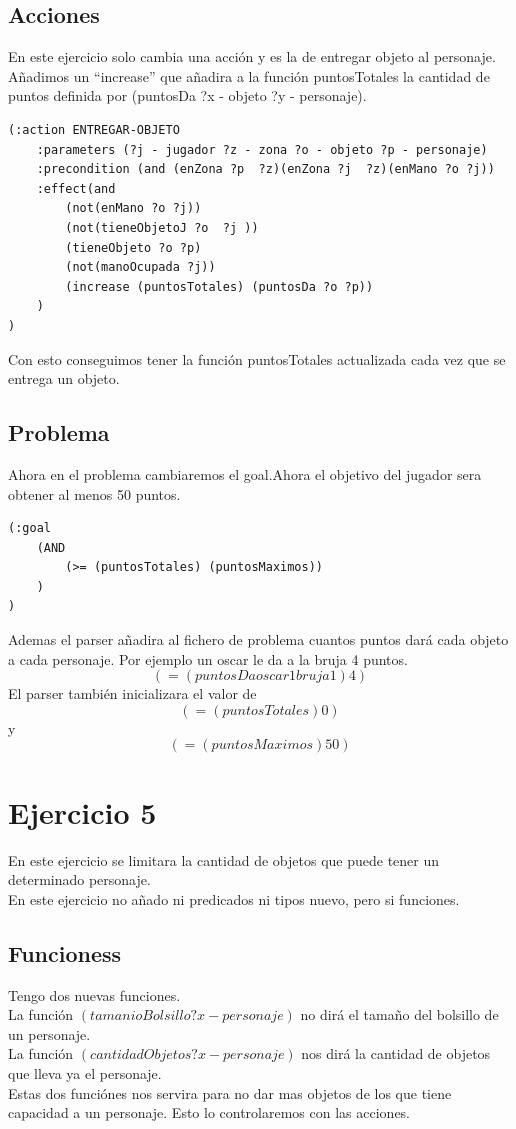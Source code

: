 \documentclass[12pt,a4paper]{article}
\begin{document}
\subsection{Acciones}
En este ejercicio solo cambia una acción y es la de entregar objeto al personaje. Añadimos un ``increase'' que añadira a la función puntosTotales la cantidad de puntos definida por (puntosDa ?x - objeto ?y - personaje).  
\begin{lstlisting}
(:action ENTREGAR-OBJETO
	:parameters (?j - jugador ?z - zona ?o - objeto ?p - personaje)
	:precondition (and (enZona ?p  ?z)(enZona ?j  ?z)(enMano ?o ?j))
	:effect(and 
		(not(enMano ?o ?j))
		(not(tieneObjetoJ ?o  ?j ))
		(tieneObjeto ?o ?p)
		(not(manoOcupada ?j))
		(increase (puntosTotales) (puntosDa ?o ?p))
	)
)
\end{lstlisting}
Con esto conseguimos tener la función puntosTotales actualizada cada vez que se entrega un objeto.
\subsection{Problema}
Ahora en el problema cambiaremos el goal.Ahora el objetivo del jugador sera obtener al menos 50 puntos.
\begin{lstlisting}
(:goal 
	(AND 
		(>= (puntosTotales) (puntosMaximos))
	)
)
\end{lstlisting} 
Ademas el parser añadira al fichero de problema cuantos puntos dará cada objeto a cada personaje. Por ejemplo un oscar le da a la bruja 4 puntos. 
$$(= (puntosDa oscar1 bruja1) 4)$$
El parser también inicializara el valor de $$(= (puntosTotales) 0)$$ y 
$$(= (puntosMaximos) 50)$$
\section{Ejercicio 5}
En este ejercicio se limitara la cantidad de objetos que puede tener un determinado personaje. \\
En este ejercicio no añado ni predicados ni tipos nuevo, pero si funciones.
\subsection{Funcioness}
Tengo dos nuevas funciones.\\
La función $(tamanioBolsillo ?x - personaje)$ no dirá el tamaño del bolsillo de un personaje.\\
La función $(cantidadObjetos ?x - personaje)$ nos dirá la cantidad de objetos que lleva ya el personaje. \\
Estas dos funciónes nos servira para no dar mas objetos de los que tiene capacidad a un personaje. Esto lo controlaremos con las acciones. 
\end{document}
